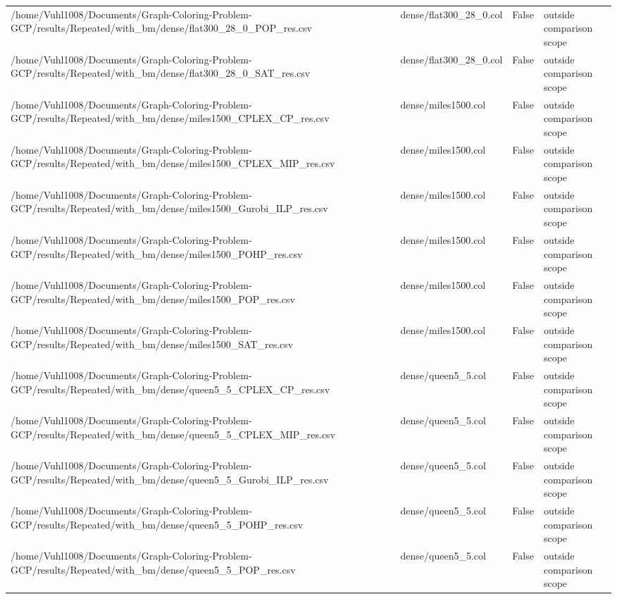 \begin{table}[htbp]
\begin{tabular}{llll}
/home/Vuhl1008/Documents/Graph-Coloring-Problem-GCP/results/Repeated/with\_bm/dense/flat300\_28\_0\_POP\_res.csv & dense/flat300\_28\_0.col & False & outside comparison scope \\
/home/Vuhl1008/Documents/Graph-Coloring-Problem-GCP/results/Repeated/with\_bm/dense/flat300\_28\_0\_SAT\_res.csv & dense/flat300\_28\_0.col & False & outside comparison scope \\
/home/Vuhl1008/Documents/Graph-Coloring-Problem-GCP/results/Repeated/with\_bm/dense/miles1500\_CPLEX\_CP\_res.csv & dense/miles1500.col & False & outside comparison scope \\
/home/Vuhl1008/Documents/Graph-Coloring-Problem-GCP/results/Repeated/with\_bm/dense/miles1500\_CPLEX\_MIP\_res.csv & dense/miles1500.col & False & outside comparison scope \\
/home/Vuhl1008/Documents/Graph-Coloring-Problem-GCP/results/Repeated/with\_bm/dense/miles1500\_Gurobi\_ILP\_res.csv & dense/miles1500.col & False & outside comparison scope \\
/home/Vuhl1008/Documents/Graph-Coloring-Problem-GCP/results/Repeated/with\_bm/dense/miles1500\_POHP\_res.csv & dense/miles1500.col & False & outside comparison scope \\
/home/Vuhl1008/Documents/Graph-Coloring-Problem-GCP/results/Repeated/with\_bm/dense/miles1500\_POP\_res.csv & dense/miles1500.col & False & outside comparison scope \\
/home/Vuhl1008/Documents/Graph-Coloring-Problem-GCP/results/Repeated/with\_bm/dense/miles1500\_SAT\_res.csv & dense/miles1500.col & False & outside comparison scope \\
/home/Vuhl1008/Documents/Graph-Coloring-Problem-GCP/results/Repeated/with\_bm/dense/queen5\_5\_CPLEX\_CP\_res.csv & dense/queen5\_5.col & False & outside comparison scope \\
/home/Vuhl1008/Documents/Graph-Coloring-Problem-GCP/results/Repeated/with\_bm/dense/queen5\_5\_CPLEX\_MIP\_res.csv & dense/queen5\_5.col & False & outside comparison scope \\
/home/Vuhl1008/Documents/Graph-Coloring-Problem-GCP/results/Repeated/with\_bm/dense/queen5\_5\_Gurobi\_ILP\_res.csv & dense/queen5\_5.col & False & outside comparison scope \\
/home/Vuhl1008/Documents/Graph-Coloring-Problem-GCP/results/Repeated/with\_bm/dense/queen5\_5\_POHP\_res.csv & dense/queen5\_5.col & False & outside comparison scope \\
/home/Vuhl1008/Documents/Graph-Coloring-Problem-GCP/results/Repeated/with\_bm/dense/queen5\_5\_POP\_res.csv & dense/queen5\_5.col & False & outside comparison scope \\

\end{tabular}
\end{table}
